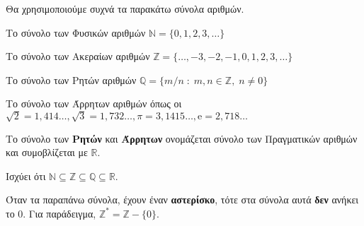 Θα χρησιμοποιούμε συχνά τα παρακάτω σύνολα αριθμών.
\begin{myitemize}
  \item Το σύνολο των \textcolor{Col1}{Φυσικών} αριθμών 
    $ \mathbb{N} = \{ 0,1,2,3,\ldots \} $
  \item Το σύνολο των \textcolor{Col1}{Ακεραίων} αριθμών 
    $ \mathbb{Z} = \{\ldots,-3,-2,-1, 0,1,2,3,\ldots \} $
  \item Το σύνολο των \textcolor{Col1}{Ρητών} αριθμών $ \mathbb{Q} = 
    \{ m/n \; : \; m,n \in \mathbb{Z}, \; n \neq 0 \} $
  \item Το σύνολο των \textcolor{Col1}{Άρρητων} αριθμών όπως οι 
    $ \sqrt{2} = 1,414\ldots, \sqrt{3} = 1, 732\ldots, \pi = 3,1415\ldots, \mathrm{e} = 
    2,718\ldots $  
  \item Το σύνολο των \textbf{Ρητών} και \textbf{Άρρητων} ονομάζεται σύνολο των
    \textcolor{Col1}{Πραγματικών} αριθμών και συμοβλίζεται με $ \mathbb{R} $.
\end{myitemize}
\begin{rem}
  Ισχύει ότι $ \mathbb{N} \subseteq \mathbb{Z} \subseteq\mathbb{Q}\subseteq\mathbb{R} $. 
\end{rem}
\begin{rem}
  Όταν τα παραπάνω σύνολα, έχουν έναν \textbf{αστερίσκο}, τότε στα σύνολα αυτά
  \textbf{δεν} ανήκει το 0. Για παράδειγμα, 
  $ \mathbb{Z}^{*} = \mathbb{Z}- \{ 0 \} $.
\end{rem}


